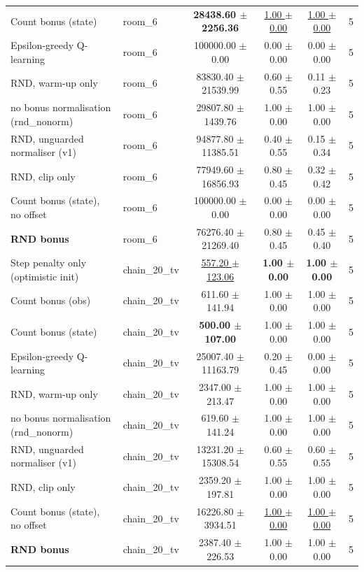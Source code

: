 \begin{tabular}{llcccc}
Count bonus (state) & room\_6 & \textbf{28438.60 $\pm$ 2256.36} & \underline{1.00 $\pm$ 0.00} & \underline{1.00 $\pm$ 0.00} & 5 \\
Epsilon-greedy Q-learning & room\_6 & 100000.00 $\pm$ 0.00 & 0.00 $\pm$ 0.00 & 0.00 $\pm$ 0.00 & 5 \\
RND, warm-up only & room\_6 & 83830.40 $\pm$ 21539.99 & 0.60 $\pm$ 0.55 & 0.11 $\pm$ 0.23 & 5 \\
no bonus normalisation (rnd\_nonorm) & room\_6 & 29807.80 $\pm$ 1439.76 & 1.00 $\pm$ 0.00 & 1.00 $\pm$ 0.00 & 5 \\
RND, unguarded normaliser (v1) & room\_6 & 94877.80 $\pm$ 11385.51 & 0.40 $\pm$ 0.55 & 0.15 $\pm$ 0.34 & 5 \\
RND, clip only & room\_6 & 77949.60 $\pm$ 16856.93 & 0.80 $\pm$ 0.45 & 0.32 $\pm$ 0.42 & 5 \\
Count bonus (state), no offset & room\_6 & 100000.00 $\pm$ 0.00 & 0.00 $\pm$ 0.00 & 0.00 $\pm$ 0.00 & 5 \\
\textbf{RND bonus} & room\_6 & 76276.40 $\pm$ 21269.40 & 0.80 $\pm$ 0.45 & 0.45 $\pm$ 0.40 & 5 \\
\midrule
Step penalty only (optimistic init) & chain\_20\_tv & \underline{557.20 $\pm$ 123.06} & \textbf{1.00 $\pm$ 0.00} & \textbf{1.00 $\pm$ 0.00} & 5 \\
Count bonus (obs) & chain\_20\_tv & 611.60 $\pm$ 141.94 & 1.00 $\pm$ 0.00 & 1.00 $\pm$ 0.00 & 5 \\
Count bonus (state) & chain\_20\_tv & \textbf{500.00 $\pm$ 107.00} & 1.00 $\pm$ 0.00 & 1.00 $\pm$ 0.00 & 5 \\
Epsilon-greedy Q-learning & chain\_20\_tv & 25007.40 $\pm$ 11163.79 & 0.20 $\pm$ 0.45 & 0.00 $\pm$ 0.00 & 5 \\
RND, warm-up only & chain\_20\_tv & 2347.00 $\pm$ 213.47 & 1.00 $\pm$ 0.00 & 1.00 $\pm$ 0.00 & 5 \\
no bonus normalisation (rnd\_nonorm) & chain\_20\_tv & 619.60 $\pm$ 141.24 & 1.00 $\pm$ 0.00 & 1.00 $\pm$ 0.00 & 5 \\
RND, unguarded normaliser (v1) & chain\_20\_tv & 13231.20 $\pm$ 15308.54 & 0.60 $\pm$ 0.55 & 0.60 $\pm$ 0.55 & 5 \\
RND, clip only & chain\_20\_tv & 2359.20 $\pm$ 197.81 & 1.00 $\pm$ 0.00 & 1.00 $\pm$ 0.00 & 5 \\
Count bonus (state), no offset & chain\_20\_tv & 16226.80 $\pm$ 3934.51 & \underline{1.00 $\pm$ 0.00} & \underline{1.00 $\pm$ 0.00} & 5 \\
\textbf{RND bonus} & chain\_20\_tv & 2387.40 $\pm$ 226.53 & 1.00 $\pm$ 0.00 & 1.00 $\pm$ 0.00 & 5 \\

\end{tabular}
